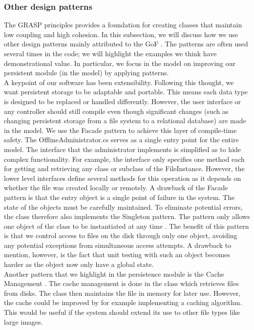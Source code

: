 \subsubsection{Other design patterns}
The GRASP principles provides a foundation for creating classes that maintain low coupling and high cohesion. In this subsection, we will discuss how we use other design patterns mainly attributed to the GoF \cite[p.~342]{OOAD}. The patterns are often used several times in the code; we will highlight the examples we think have demonstrational value. In particular, we focus in the model on improving our persistent module (in the model) by applying patterns.\\
\newline
A keypoint of our software has been extensibility. Following this thought, we want persistent storage to be adaptable and portable. This means each data type is designed to be replaced or handled differently. However, the user interface or any controller should still compile even though significant changes (such as changing persistent storage from a file system to a relational database) are made in the model. We use the Facade pattern to achieve this layer of compile-time safety. The OfflineAdministrator.cs serves as a single entry point for the entire model. The interface that the administrator implements is simplified as to hide complex functionality. For example, the interface only specifies one method each for getting and retrieving any class or subclass of the FileInstance. However, the lower level interfaces define several methods for this operation as it depends on whether the file was created locally or remotely. 
A drawback of the Facade pattern is that the entry object is a single point of failure in the system. The state of the objects must be carefully maintained. To eliminate potential errors, the class therefore also implements the Singleton pattern. The pattern only allows one object of the class to be instantiated at any time \cite[p.~348]{OOAD}. The benefit of this pattern is that we control access to files on the disk through only one object, avoiding any potential exceptions from simultaneous access attempts. A drawback to mention, however, is the fact that unit testing
with such an object becomes harder as the object now only have a global state.\\
\newline
Another pattern that we highlight in the persistence module is the Cache Management \cite[p.~551]{OOAD}. The cache management is done in the class which retrieves files from disks. The class then maintains the file in memory for later use. However, the cache could be improved by for example implementing a caching algorithm. This would be useful if the system should extend its use to other file types like large images.\\
